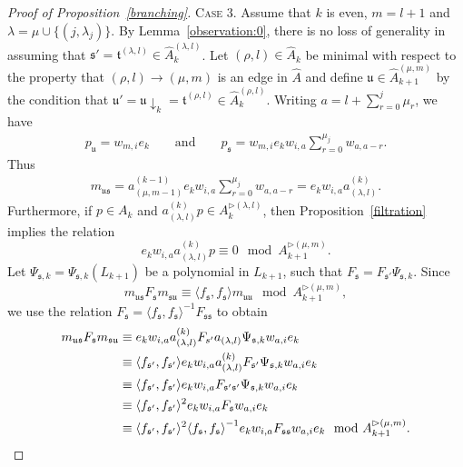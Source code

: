 \documentclass[11pt,a4paper,reqno,svgnames]{amsart}
\theoremstyle{plain}
\theoremstyle{definition}
\numberwithin{equation}{section}
\begin{document}
\begin{proof}[Proof of Proposition~\ref{branching}]
{\textsc{Case 3.}} Assume that $k$ is even,  $m=l+1$ and $\lambda=\mu\cup\lbrace(j,\lambda_j)\rbrace$. By Lemma~\ref{observation:0}, there is no loss of generality in assuming that $\mathfrak{s'}=\mathfrak{t}^{(\lambda,l)}\in\hat{A}_k^{(\lambda,l)}$.  Let $(\rho,l)\in\hat{A}_k$ be minimal with respect to the property that $(\rho,l)\to(\mu,m)$ is an edge in $\hat{A}$ and define $\mathfrak{u}\in\hat{A}_{k+1}^{(\mu,m)}$ by the condition that $\mathfrak{u}'=\mathfrak{u}\downarrow_{k}=\mathfrak{t}^{(\rho,l)}\in\hat{A}_{k}^{(\rho,l)}$. Writing $a=l+\sum_{r=0}^{j}\mu_r$, we have 
\begin{align*}
p_\mathfrak{u}=w_{m,i}e_k\qquad\text{and}\qquad p_\mathfrak{s}=w_{m,i}e_kw_{i,a}\sum_{r=0}^{\mu_j}w_{a,a-r}.
\end{align*}
Thus
\begin{align*}
m_\mathfrak{us}=a_{(\mu,m-1)}^{(k-1)}e_kw_{i,a}\sum_{r=0}^{\mu_j}w_{a,a-r}=e_kw_{i,a}a_{(\lambda,l)}^{(k)}.
\end{align*}
Furthermore, if $p\in A_k$ and $a_{(\lambda,l)}^{(k)}p\in A_k^{\rhd(\lambda,l)}$, then  Proposition~\ref{filtration} implies the relation
\[
e_kw_{i,a}a_{(\lambda,l)}^{(k)}p\equiv0\mod A_{k+1}^{\rhd(\mu,m)}.
\] 
Let $\Psi_{\mathfrak{s},k}=\Psi_{\mathfrak{s},k}(L_{k+1})$ be a polynomial in $L_{k+1}$, such that $F_\mathfrak{s}=F_\mathfrak{s'}\Psi_{\mathfrak{s},k}$. Since 
\[
m_\mathfrak{us}F_\mathfrak{s}m_\mathfrak{su}\equiv \langle f_\mathfrak{s},f_\mathfrak{s}\rangle m_\mathfrak{uu}\mod A_{k+1}^{\rhd(\mu,m)}, 
\]
we use the relation $F_\mathfrak{s}=\langle f_\mathfrak{s},f_\mathfrak{s}\rangle^{-1}F_\mathfrak{ss}$ to obtain  
\begin{align}
m_\mathfrak{us}F_\mathfrak{s}m_\mathfrak{su}&\equiv e_kw_{i,a} a_{(\lambda,l)}^{(k)}F_{s'}a_{(\lambda,l)}\Psi_{\mathfrak{s},k}w_{a,i}e_k\notag\\
&\equiv \langle f_\mathfrak{s'},f_\mathfrak{s'}\rangle e_kw_{i,a}a_{(\lambda,l)}^{(k)}F_\mathfrak{s'} \Psi_{\mathfrak{s},k}w_{a,i}e_k \notag \\ 
&\equiv \langle f_\mathfrak{s'},f_\mathfrak{s'}\rangle e_kw_{i,a}F_\mathfrak{s's'}\Psi_{\mathfrak{s},k}  w_{a,i}e_k \notag \\
&\equiv {\langle f_\mathfrak{s'},f_\mathfrak{s'}\rangle^2} e_kw_{i,a}F_\mathfrak{s} w_{a,i}e_k \notag \\
&\equiv {\langle f_\mathfrak{s'},f_\mathfrak{s'}\rangle^2}{\langle f_\mathfrak{s},f_\mathfrak{s}\rangle}^{-1} e_kw_{i,a}F_\mathfrak{ss} w_{a,i}e_k \mod A_{k+1}^{\rhd(\mu,m)}.\label{cong:1}
\end{align}

\end{proof}
\end{document}
